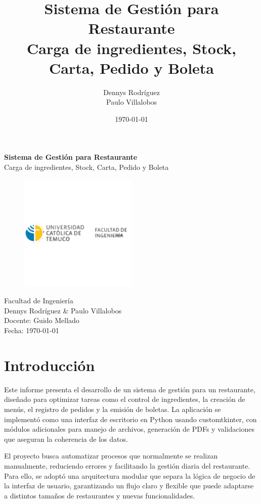 \documentclass[12pt,a4paper]{article}
\title{\textbf{Sistema de Gestión para Restaurante}\\\large Carga de ingredientes, Stock, Carta, Pedido y Boleta}
\author{Dennys Rodríguez \\ Paulo Villalobos}
\date{\today}
\begin{document}
\begin{titlepage}
  \centering
  \vspace*{1cm}
  {\Huge \textbf{Sistema de Gestión para Restaurante}\\[6pt]}
  {\Large Carga de ingredientes, Stock, Carta, Pedido y Boleta}\\[1.2cm]
  \begin{figure}[h]
  \centering
  \includegraphics[width=0.5\textwidth]{logo.png}
  \label{fig:logo}
\end{figure}
  {\large Facultad de Ingeniería}\\[0.2cm]
  {\large Dennys Rodríguez \;\&\; Paulo Villalobos}\\[0.2cm]
  {\large Docente: Guido Mellado}\\[0.2cm]
  {\large Fecha: \today}\\[0.8cm]
  \vfill
\end{titlepage}

\tableofcontents
\newpage


\newpage
\section{Introducción}
Este informe presenta el desarrollo de un sistema de gestión para un restaurante, diseñado para optimizar tareas como el control de ingredientes, la creación de menús, el registro de pedidos y la emisión de boletas. La aplicación se implementó como una interfaz de escritorio en Python usando customtkinter, con módulos adicionales para manejo de archivos, generación de PDFs y validaciones que aseguran la coherencia de los datos.

El proyecto busca automatizar procesos que normalmente se realizan manualmente, reduciendo errores y facilitando la gestión diaria del restaurante. Para ello, se adoptó una arquitectura modular que separa la lógica de negocio de la interfaz de usuario, garantizando un flujo claro y flexible que puede adaptarse a distintos tamaños de restaurantes y nuevas funcionalidades.
\end{document}
